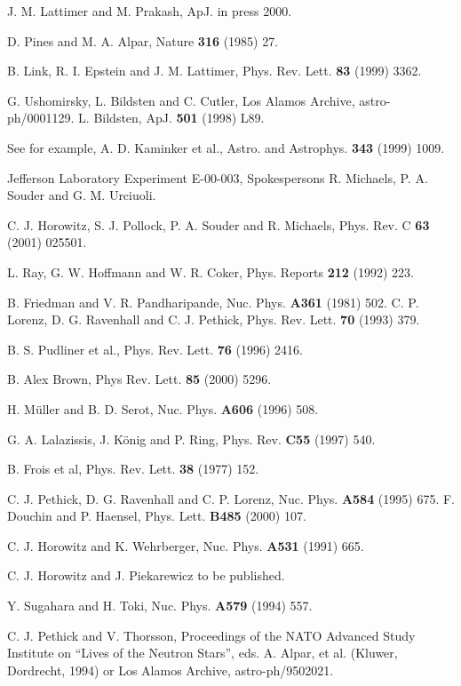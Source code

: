 \begin{references}
 J. M. Lattimer and M. Prakash, ApJ. in press 2000.

 D. Pines and M. A. Alpar, Nature {\bf 316} (1985) 27.

 B. Link, R. I. Epstein and J. M. Lattimer,
Phys. Rev. Lett. {\bf 83} (1999) 3362.

 G. Ushomirsky, L. Bildsten and C. Cutler, Los Alamos
Archive, astro-ph/0001129.  L. Bildsten, ApJ. {\bf 501} (1998) L89.

 See for example, A. D. Kaminker et al., Astro. and
Astrophys. {\bf 343} (1999) 1009.
 
 Jefferson Laboratory Experiment E-00-003, Spokespersons
R. Michaels, P. A. Souder and G. M. Urciuoli.

 C. J. Horowitz, S. J. Pollock, P. A. Souder and
R. Michaels, Phys. Rev. C {\bf 63} (2001) 025501.

L. Ray, G. W. Hoffmann and W. R. Coker, Phys. Reports
{\bf 212} (1992) 223.

 B. Friedman and V. R. Pandharipande, Nuc. Phys. {\bf
A361} (1981) 502.  C. P. Lorenz, D. G. Ravenhall and C. J. Pethick,
Phys. Rev. Lett. {\bf 70} (1993) 379.

 B. S. Pudliner et al., Phys. Rev. Lett. {\bf 76}
(1996) 2416.

 B. Alex Brown, Phys Rev. Lett. {\bf 85} (2000) 5296.

 H. M\"uller and B. D. Serot, Nuc. Phys. {\bf A606}
(1996) 508.

G. A. Lalazissis, J. K\"onig and P. Ring, Phys. Rev. 
{\bf C55} (1997) 540.

 B. Frois et al, Phys. Rev. Lett. {\bf 38} (1977) 152.

 C. J. Pethick, D. G. Ravenhall and C. P. Lorenz,
Nuc. Phys. {\bf A584} (1995) 675.  F. Douchin and P. Haensel,
Phys. Lett. {\bf B485} (2000) 107.

 C. J. Horowitz and K. Wehrberger, Nuc. Phys. {\bf
A531} (1991) 665.

 C. J. Horowitz and J. Piekarewicz to be published.

 Y. Sugahara and H. Toki, Nuc. Phys. {\bf A579} (1994) 557.

 C. J. Pethick and V. Thorsson, Proceedings of the NATO
Advanced Study Institute on ``Lives of the Neutron Stars'',
eds. A. Alpar, et al. (Kluwer, Dordrecht,
1994) or Los Alamos Archive, astro-ph/9502021.

\end{references}
